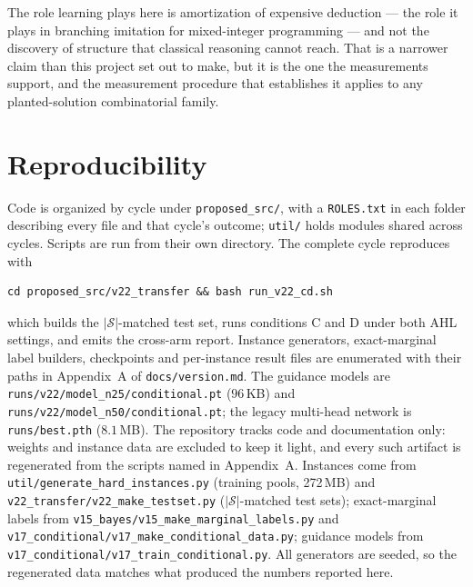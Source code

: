 \documentclass[12pt]{article}
\begin{document}
The role learning plays here is amortization of expensive deduction --- the role it plays in branching imitation for mixed-integer programming --- and not the discovery of structure that classical reasoning cannot reach. That is a narrower claim than this project set out to make, but it is the one the measurements support, and the measurement procedure that establishes it applies to any planted-solution combinatorial family.

\section*{Reproducibility}

Code is organized by cycle under \texttt{proposed\_src/}, with a \texttt{ROLES.txt} in each folder describing every file and that cycle's outcome; \texttt{util/} holds modules shared across cycles. Scripts are run from their own directory. The complete cycle reproduces with
\begin{verbatim}
cd proposed_src/v22_transfer && bash run_v22_cd.sh
\end{verbatim}
which builds the $|\mathcal{S}|$-matched test set, runs conditions C and D under both AHL settings, and emits the cross-arm report. Instance generators, exact-marginal label builders, checkpoints and per-instance result files are enumerated with their paths in Appendix~A of \texttt{docs/version.md}. The guidance models are \texttt{runs/v22/model\_n25/conditional.pt} ($96$\,KB) and \texttt{runs/v22/model\_n50/conditional.pt}; the legacy multi-head network is \texttt{runs/best.pth} ($8.1$\,MB). The repository tracks code and documentation only: weights and instance data are excluded to keep it light, and every such artifact is regenerated from the scripts named in Appendix~A. Instances come from \texttt{util/generate\_hard\_instances.py} (training pools, 272\,MB) and \texttt{v22\_transfer/v22\_make\_testset.py} ($|\mathcal{S}|$-matched test sets); exact-marginal labels from \texttt{v15\_bayes/v15\_make\_marginal\_labels.py} and \texttt{v17\_conditional/v17\_make\_conditional\_data.py}; guidance models from \texttt{v17\_conditional/v17\_train\_conditional.py}. All generators are seeded, so the regenerated data matches what produced the numbers reported here.
\end{document}
